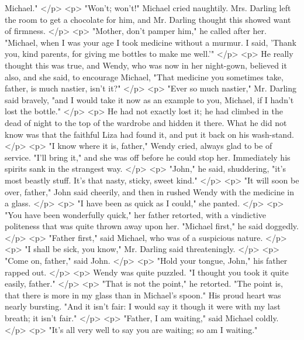       Michael."
    </p>
    <p>
      "Won't; won't!" Michael cried naughtily. Mrs. Darling left the room to get
      a chocolate for him, and Mr. Darling thought this showed want of firmness.
    </p>
    <p>
      "Mother, don't pamper him," he called after her. "Michael, when I was your
      age I took medicine without a murmur. I said, 'Thank you, kind parents,
      for giving me bottles to make me well.'"
    </p>
    <p>
      He really thought this was true, and Wendy, who was now in her night-gown,
      believed it also, and she said, to encourage Michael, "That medicine you
      sometimes take, father, is much nastier, isn't it?"
    </p>
    <p>
      "Ever so much nastier," Mr. Darling said bravely, "and I would take it now
      as an example to you, Michael, if I hadn't lost the bottle."
    </p>
    <p>
      He had not exactly lost it; he had climbed in the dead of night to the top
      of the wardrobe and hidden it there. What he did not know was that the
      faithful Liza had found it, and put it back on his wash-stand.
    </p>
    <p>
      "I know where it is, father," Wendy cried, always glad to be of service.
      "I'll bring it," and she was off before he could stop her. Immediately his
      spirits sank in the strangest way.
    </p>
    <p>
      "John," he said, shuddering, "it's most beastly stuff. It's that nasty,
      sticky, sweet kind."
    </p>
    <p>
      "It will soon be over, father," John said cheerily, and then in rushed
      Wendy with the medicine in a glass.
    </p>
    <p>
      "I have been as quick as I could," she panted.
    </p>
    <p>
      "You have been wonderfully quick," her father retorted, with a vindictive
      politeness that was quite thrown away upon her. "Michael first," he said
      doggedly.
    </p>
    <p>
      "Father first," said Michael, who was of a suspicious nature.
    </p>
    <p>
      "I shall be sick, you know," Mr. Darling said threateningly.
    </p>
    <p>
      "Come on, father," said John.
    </p>
    <p>
      "Hold your tongue, John," his father rapped out.
    </p>
    <p>
      Wendy was quite puzzled. "I thought you took it quite easily, father."
    </p>
    <p>
      "That is not the point," he retorted. "The point is, that there is more in
      my glass than in Michael's spoon." His proud heart was nearly bursting.
      "And it isn't fair: I would say it though it were with my last breath; it
      isn't fair."
    </p>
    <p>
      "Father, I am waiting," said Michael coldly.
    </p>
    <p>
      "It's all very well to say you are waiting; so am I waiting."
